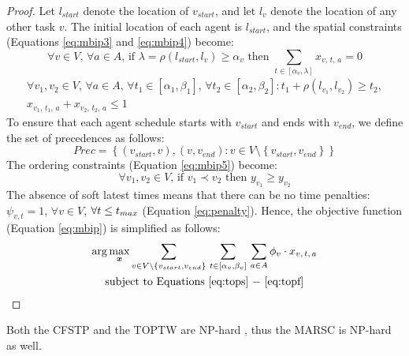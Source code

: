 \begin{proof}
Let $l_{start}$ denote the location of $v_{start}$, and let $l_v$ denote the location of
any other task $v$. The initial location of each agent is $l_{start}$, and the spatial
constraints (Equations \ref{eq:mbip3} and \ref{eq:mbip4}) become:
\begin{equation}
    \forall v \in V,\, \forall a \in A,\,
    \text{if } \lambda = \rho(l_{start}, l_v) \geq \alpha_v \text{ then }
    \sum_{t \in [\alpha_v, \lambda]} x_{v,\, t,\, a} = 0
\end{equation}
\begin{equation}
\begin{gathered}
    \forall v_1, v_2 \in V,\, \forall a \in A,\,
    \forall t_1 \in [\alpha_1, \beta_1],\, \forall t_2 \in [\alpha_2, \beta_2]
    : t_1 + \rho(l_{v_1}, l_{v_2}) \geq t_2,\\
    x_{v_1,\, t_1,\, a} + x_{v_2,\, t_2,\, a} \leq 1
\end{gathered}
\end{equation}
To ensure that each agent schedule starts with $v_{start}$ and ends with $v_{end}$, we
define the set of precedences as follows:
\begin{equation*}
    Prec = \left\{ (v_{start}, v), (v, v_{end}) : v \in V \setminus \left\{ v_{start},
    v_{end} \right\} \right\}
\end{equation*}
The ordering constraints (Equation \ref{eq:mbip5}) become:
\begin{equation}
    \forall v_1, v_2 \in V,\, \text{if } v_1 \prec v_2 \text{ then }
    y_{v_1} \geq y_{v_2}\label{eq:topf}
\end{equation}
The absence of soft latest times means that there can be no time penalties: $\psi_{v,t} =
1$, $\forall v \in V$, $\forall t \leq t_{max}$ (Equation \ref{eq:penalty}). Hence, the
objective function (Equation \ref{eq:mbip}) is simplified as follows:
\begin{equation}
    \begin{gathered}
    \arg \max_{\bm{x}} \sum_{v \in V \setminus \{v_{start}, v_{end}\}}\,
    \sum_{t \in [\alpha_v, \beta_v]}\,
    \sum_{a \in A} \phi_v \cdot x_{v,\, t,\, a}\\
    \text{subject to Equations \ref{eq:tops} $-$ \ref{eq:topf}}
    \end{gathered}
    \label{eq:topof}
\end{equation}
\end{proof}

Both the CFSTP and the TOPTW are NP-hard \cite{ramchurn2010cfstp,top2019}, thus the MARSC
is NP-hard as well.

